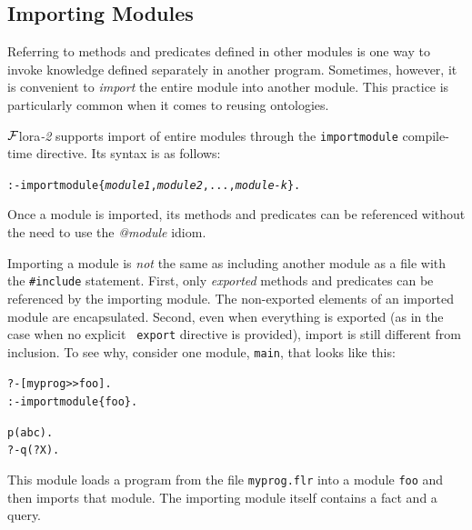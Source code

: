 \documentclass[11pt]{article}
\newcommand{\FLSYSTEM}{{\mbox{\sc ${\cal F}${lora}\rm\emph{-2}}}\xspace}
\newcommand{\flrext}{flr}
\begin{document}
\subsection{Importing Modules}\label{sec-module-import}

Referring to methods and predicates defined in other modules is one way to
invoke knowledge defined separately in another program. Sometimes, however,
it is convenient to \emph{import} the entire module into another module.
This practice is particularly common when it comes to reusing ontologies.

\FLSYSTEM supports import of entire modules through the {\tt importmodule}
compile-time directive. Its syntax is as follows:

\begin{alltt}
 :- importmodule\{\textit{module1}, \textit{module2}, ..., \textit{module-k}\}.
\end{alltt}

Once a module is imported, its methods and predicates can be referenced
without the need to use the \emph{@module} idiom. 

Importing a module is \emph{not} the same as including another module as a
file with the {\tt \#include} statement. First, only \emph{exported}
methods and predicates can be referenced by the importing module.
The non-exported elements of an imported module are encapsulated.
Second,
even when everything is exported (as in the case when no explicit {\tt
  export} directive is provided), import is still different from inclusion.
To see why, consider one module, {\tt main}, that looks like this:

\begin{alltt}
  ?- [myprog>{}>foo].
  :- importmodule\{foo\}.

  p(abc).
  ?- q(?X).
\end{alltt}
This module loads a program from the file {\tt myprog.\flrext} into a module
{\tt foo} and then imports that module.  
The importing module itself contains a fact and a query.
\end{document}
